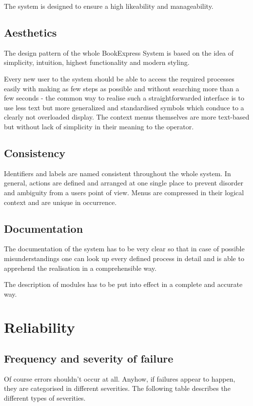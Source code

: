 \documentclass[11pt,a4paper,oneside,svgnames]{report}
\begin{document}
The system is designed to ensure a high likeability and manageability.

\subsection{Aesthetics}
The design pattern of the whole BookExpress System is based on the idea of simplicity, intuition, highest functionality and modern styling.

Every new user to the system should be able to access the required processes easily with making as few steps as possible and without searching more than a few seconds - the common way to realise such a straightforwarded interface is to use less text but more generalized and standardised symbols which conduce to a clearly not overloaded display. The context menus themselves are more text-based but without lack of simplicity in their meaning to the operator.

\subsection{Consistency}
Identifiers and labels are named consistent throughout the whole system. In general, actions are defined and arranged at one single place to prevent disorder and ambiguity from a users point of view. Menus are compressed in their logical context and are unique in occurrence.

\subsection{Documentation}
The documentation of the system has to be very clear so that in case of possible misunderstandings one can look up every defined process in detail and is able to apprehend the realisation in a comprehensible way.

The description of modules has to be put into effect in a complete and accurate way.


\section{Reliability}

\subsection{Frequency and severity of failure}
Of course errors shouldn't occur at all. Anyhow, if failures appear to happen, they are categorised in different severities. The following table describes the different types of severities.
\end{document}
